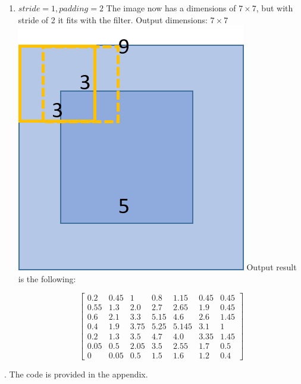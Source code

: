 \documentclass[a4paper]{iacas}
\begin{document}
\begin{enumerate}
\item $stride = 1, padding = 2$
The image now has a dimensions of $7\times7$, but with stride of 2 it fits with the filter. Output dimensions: $7\times7$
\newline
\includegraphics[scale=0.8]{imgs/q_1_32.png}
\newline
Output result is the following:

\begin{equation*}
\left[
\begin{matrix}
0.2 & 0.45 & 1 & 0.8 & 1.15 & 0.45 & 0.45 \\
0.55 & 1.3 & 2.0 & 2.7 & 2.65 & 1.9 & 0.45 \\
0.6 & 2.1 & 3.3 & 5.15 & 4.6 & 2.6 & 1.45\\
0.4 & 1.9 & 3.75 & 5.25 & 5.145 & 3.1 & 1 \\
0.2 & 1.3 & 3.5 & 4.7 & 4.0 & 3.35 & 1.45\\
0.05 & 0.5 & 2.05 & 3.5 & 2.55 & 1.7 & 0.5 \\ 
0 & 0.05 & 0.5 & 1.5 & 1.6 & 1.2 & 0.4
\end{matrix}
\right]
\end{equation*}
\end{enumerate}.
The code is provided in the appendix.


\newpage
\end{document}
